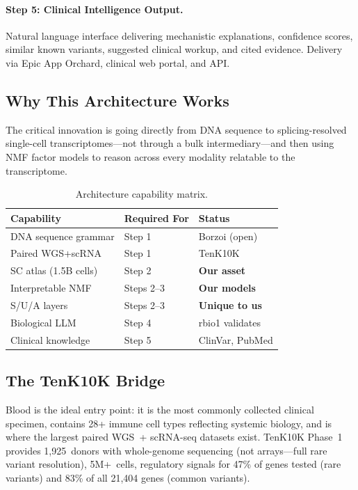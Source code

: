 \documentclass[10pt,twocolumn,letterpaper]{article}
\begin{document}
\paragraph{Step 5: Clinical Intelligence Output.} Natural language interface
delivering mechanistic explanations, confidence scores, similar known variants,
suggested clinical workup, and cited evidence. Delivery via Epic App Orchard,
clinical web portal, and API.

\subsection{Why This Architecture Works}

The critical innovation is going directly from DNA sequence to splicing-resolved
single-cell transcriptomes---not through a bulk intermediary---and then using NMF
factor models to reason across every modality relatable to the transcriptome.

\begin{table}[h]
\centering
\small
\begin{tabular}{@{}lll@{}}
\toprule
\textbf{Capability} & \textbf{Required For} & \textbf{Status} \\
\midrule
DNA sequence grammar & Step 1 & Borzoi (open) \\
Paired WGS+scRNA & Step 1 & TenK10K \\
SC atlas (1.5B cells) & Step 2 & \textbf{Our asset} \\
Interpretable NMF & Steps 2--3 & \textbf{Our models} \\
S/U/A layers & Steps 2--3 & \textbf{Unique to us} \\
Biological LLM & Step 4 & rbio1 validates \\
Clinical knowledge & Step 5 & ClinVar, PubMed \\
\bottomrule
\end{tabular}
\caption{Architecture capability matrix.}
\label{tab:capabilities}
\end{table}

\subsection{The TenK10K Bridge}

Blood is the ideal entry point: it is the most commonly collected clinical
specimen, contains 28+ immune cell types reflecting systemic biology, and is
where the largest paired WGS~+ scRNA-seq datasets exist. TenK10K Phase~1
provides 1,925~donors with whole-genome sequencing (not arrays---full rare
variant resolution), 5M+~cells, regulatory signals for 47\% of genes tested
(rare variants) and 83\% of all 21,404 genes (common variants).
\end{document}

